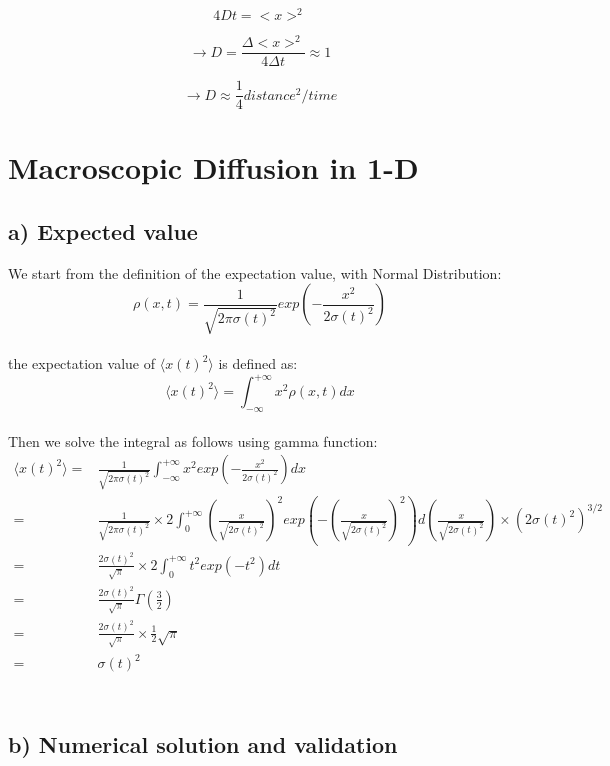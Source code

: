 \documentclass[a4paper]{article}
\begin{document}
\[ 4Dt = <x>^2 \]

\[ \rightarrow D = \frac{\Delta<x>^2}{4\Delta t} \approx 1 \]

\[ \rightarrow D \approx \frac{1}{4}  distance^2/time     \]

\section{Macroscopic Diffusion in 1-D}

\subsection*{a) Expected value}
We start from the definition of the expectation value, with Normal Distribution:
\begin{equation}\label{1}
  \rho(x,t)=\frac{1}{\sqrt{2\pi\sigma(t)^2}}exp(-\frac{x^2}{2\sigma(t)^2})
\end{equation}\\
the expectation value of $\langle x(t)^2 \rangle$ is defined as:
\begin{equation}\label{2}
  \langle x(t)^2 \rangle =\int_{-\infty}^{+\infty}x^2\rho(x,t)dx
\end{equation}\\
Then we solve the integral as follows using gamma function:
\begin{equation}\label{3}
  \begin{split}
  \langle x(t)^2 \rangle=&\frac{1}{\sqrt{2\pi\sigma(t)^2}}\int_{-\infty}^{+\infty}x^2exp(-\frac{x^2}{2\sigma(t)^2})dx\\
                        =&\frac{1}{\sqrt{2\pi\sigma(t)^2}}\times 2\int_{0}^{+\infty}(\frac{x}{\sqrt{2\sigma(t)^2}})^2
                           exp(-(\frac{x}{\sqrt{2\sigma(t)^2}})^2)d(\frac{x}{\sqrt{2\sigma(t)^2}})\times (2\sigma(t)^2)^{3/2}\\
                        =&\frac{2\sigma(t)^2}{\sqrt{\pi}}\times 2\int_{0}^{+\infty}t^2exp(-t^2)dt\\
                        =&\frac{2\sigma(t)^2}{\sqrt{\pi}}\Gamma(\frac{3}{2})\\
                        =&\frac{2\sigma(t)^2}{\sqrt{\pi}}\times \frac{1}{2}\sqrt{\pi}\\
                        =&\sigma(t)^2 \\
  \end{split}
\end{equation}\\


\subsection*{b) Numerical solution and validation}
\end{document}
